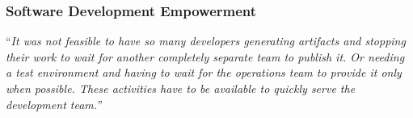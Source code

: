 \documentclass{beamer}
\newcommand{\memph}[1]{\alert{#1}}
\begin{document}
\begin{frame}
  \frametitle{Software Development Empowerment}

  \begin{flushright}
    ``\emph{It was not feasible to have so many \memph{developers} generating artifacts
    and \memph{stopping their work to wait for another completely separate team to publish it}.
    Or needing a test environment and having to wait for the operations team
    to provide it only when possible. These activities have to be available
    to quickly serve the development team.''} 
  \end{flushright}
\end{frame}

\end{document}

